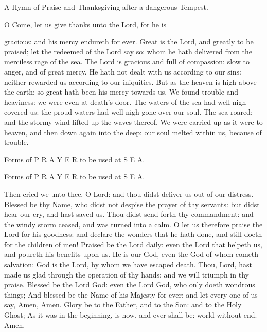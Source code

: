 A Hymn of Praise and Thanksgiving after a dangerous Tempest.

O Come, let us give thanks unto the Lord, for he is

gracious: and his mercy endureth for ever. Great is the Lord, and greatly to be praised; let the redeemed of the Lord say so: whom he hath delivered from the merciless rage of the sea. The Lord is gracious and full of compassion: slow to anger, and of great mercy. He hath not dealt with us according to our sins: neither rewarded us according to our iniquities. But as the heaven is high above the earth: so great hath been his mercy towards us. We found trouble and heaviness: we were even at death’s door. The waters of the sea had well-nigh covered us: the proud waters had well-nigh gone over our soul. The sea roared: and the stormy wind lifted up the waves thereof. We were carried up as it were to heaven, and then down again into the deep: our soul melted within us, because of trouble.

Forms of P R A Y E R to be used at S E A.

Forms of P R A Y E R to be used at S E A.

Then cried we unto thee, O Lord: and thou didst deliver us out of our distress. Blessed be thy Name, who didst not despise the prayer of thy servants: but didst hear our cry, and hast saved us. Thou didst send forth thy commandment: and the windy storm ceased, and was turned into a calm. O let us therefore praise the Lord for his goodness: and declare the wonders that he hath done, and still doeth for the children of men! Praised be the Lord daily: even the Lord that helpeth us, and poureth his benefits upon us. He is our God, even the God of whom cometh salvation: God is the Lord, by whom we have escaped death. Thou, Lord, hast made us glad through the operation of thy hands: and we will triumph in thy praise. Blessed be the Lord God: even the Lord God, who only doeth wondrous things; And blessed be the Name of his Majesty for ever: and let every one of us say, Amen, Amen. Glory be to the Father, and to the Son: and to the Holy Ghost; As it was in the beginning, is now, and ever shall be: world without end. Amen.

